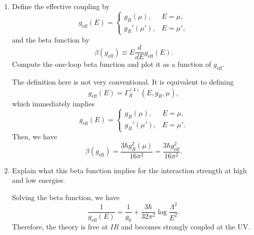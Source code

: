 \begin{enumerate}[label=\alph*)]
    \item Define the effective coupling by
    \begin{equation}
        g_{\mathrm{eff}}(E)
        =\begin{cases}
            g_R(\mu), & E=\mu,\\
            g_R'(\mu'), & E=\mu',
        \end{cases}
    \end{equation}
    and the beta function by
    \begin{equation}
        \beta(g_{\mathrm{eff}})
        \equiv E\frac{d}{dE}g_{\mathrm{eff}}(E).
    \end{equation}
    Compute the one-loop beta function and plot it as a function of
    $g_{\mathrm{eff}}$.
    \begin{solution}
        The definition here is not very conventional. It is equivalent to defining
        \begin{equation}
            g_\mathrm{eff}(E) = \Gamma_R^{(4)}(E,g_R,\mu),
        \end{equation}
        which immediately implies
        \begin{equation}
            g_{\mathrm{eff}}(E)
            =\begin{cases}
                g_R(\mu), & E=\mu,\\
                g_R'(\mu'), & E=\mu'.
            \end{cases}
        \end{equation}
        Then, we have
        \begin{equation}
            \beta(g_\mathrm{eff}) = \frac{3\hbar g_R^2(\mu)}{16\pi^2} = \frac{3\hbar g_\mathrm{eff}^2}{16\pi^2}.
        \end{equation}
    \end{solution}

    \item Explain what this beta function implies for the interaction strength at
    high and low energies.
    \begin{solution}
        Solving the beta function, we have
        \begin{equation}
            \frac{1}{g_\mathrm{eff}(E)} = \frac{1}{g_0} + \frac{3\hbar}{32\pi^2}\log\frac{\Lambda^2}{E^2}.
        \end{equation}
        Therefore, the theory is free at $IR$ and becomes strongly coupled at the UV.
    \end{solution}
\end{enumerate}

